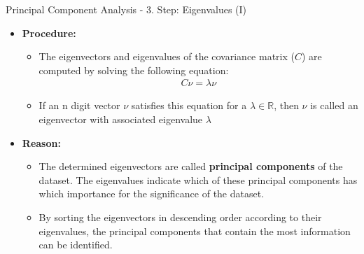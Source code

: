 \begin{frame}{Principal Component Analysis - 3. Step: Eigenvalues (I)}
	\begin{itemize}
		\item \textbf{Procedure:}
		      \begin{itemize}
			      \item The eigenvectors and eigenvalues of the covariance matrix
			            ($C$) are computed by solving the following equation:
			            \begin{align*}
				            C \nu = \lambda \nu
			            \end{align*}
			      \item If an n digit vector $\nu$ satisfies this equation for a
			            $\lambda \in \mathbb{R}$, then $\nu$ is called an eigenvector with
			            associated eigenvalue $\lambda$
		      \end{itemize}
		\item \textbf{Reason:}
		      \begin{itemize}
			      \item The determined eigenvectors are called \textbf{principal
				            components} of the dataset. The eigenvalues indicate which of these
			            principal components has which importance for the significance of
			            the dataset.
			      \item By sorting the eigenvectors in descending order according to
			            their eigenvalues, the principal components that contain the most
			            information can be identified.
		      \end{itemize}
	\end{itemize}
\end{frame}

